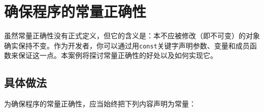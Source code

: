
\section{确保程序的常量正确性}



虽然常量正确性没有正式定义，但它的含义是：本不应被修改（即不可变）的对象确实保持不变。作为开发者，你可以通过用\texttt{const}关键字声明参数、变量和成员函数来保证这一点。本案例将探讨常量正确性的好处以及如何实现它。



\subsection{具体做法}



为确保程序的常量正确性，应当始终把下列内容声明为常量：



